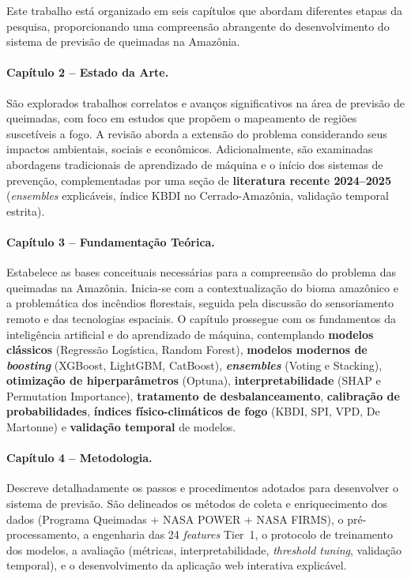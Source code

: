 
Este trabalho está organizado em seis capítulos que abordam diferentes etapas da pesquisa, proporcionando uma compreensão abrangente do desenvolvimento do sistema de previsão de queimadas na Amazônia.

\paragraph{Capítulo 2 -- Estado da Arte.} São explorados trabalhos correlatos e avanços significativos na área de previsão de queimadas, com foco em estudos que propõem o mapeamento de regiões suscetíveis a fogo. A revisão aborda a extensão do problema considerando seus impactos ambientais, sociais e econômicos. Adicionalmente, são examinadas abordagens tradicionais de aprendizado de máquina e o início dos sistemas de prevenção, complementadas por uma seção de \textbf{literatura recente 2024--2025} (\emph{ensembles} explicáveis, índice KBDI no Cerrado-Amazônia, validação temporal estrita).

\paragraph{Capítulo 3 -- Fundamentação Teórica.} Estabelece as bases conceituais necessárias para a compreensão do problema das queimadas na Amazônia. Inicia-se com a contextualização do bioma amazônico e a problemática dos incêndios florestais, seguida pela discussão do sensoriamento remoto e das tecnologias espaciais. O capítulo prossegue com os fundamentos da inteligência artificial e do aprendizado de máquina, contemplando \textbf{modelos clássicos} (Regressão Logística, Random Forest), \textbf{modelos modernos de \emph{boosting}} (XGBoost, LightGBM, CatBoost), \textbf{\emph{ensembles}} (Voting e Stacking), \textbf{otimização de hiperparâmetros} (Optuna), \textbf{interpretabilidade} (SHAP e Permutation Importance), \textbf{tratamento de desbalanceamento}, \textbf{calibração de probabilidades}, \textbf{índices físico-climáticos de fogo} (KBDI, SPI, VPD, De Martonne) e \textbf{validação temporal} de modelos.

\paragraph{Capítulo 4 -- Metodologia.} Descreve detalhadamente os passos e procedimentos adotados para desenvolver o sistema de previsão. São delineados os métodos de coleta e enriquecimento dos dados (Programa Queimadas + NASA POWER + NASA FIRMS), o pré-processamento, a engenharia das 24 \emph{features} Tier~1, o protocolo de treinamento dos modelos, a avaliação (métricas, interpretabilidade, \emph{threshold tuning}, validação temporal), e o desenvolvimento da aplicação web interativa explicável.

